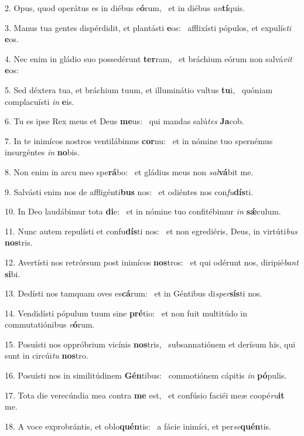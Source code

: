 2. Opus, quod operátus es in diébus e\textbf{ó}rum, \ast\  et in diébus \textit{an}\textbf{tí}quis.\

3. Manus tua gentes dispérdidit, et plantásti \textbf{e}os: \ast\  afflixísti pópulos, et expulís\textit{ti} \textbf{e}os.\

4. Nec enim in gládio suo possedérunt \textbf{ter}ram, \ast\  et bráchium eórum non salvá\textit{vit} \textbf{e}os:\

5. Sed déxtera tua, et bráchium tuum, et illuminátio vultus \textbf{tu}i, \ast\  quóniam complacuísti \textit{in} \textbf{e}is.\

6. Tu es ipse Rex meus et Deus \textbf{me}us: \ast\  qui mandas salú\textit{tes} \textbf{Ja}cob.\

7. In te inimícos nostros ventilábimus \textbf{cor}nu: \ast\  et in nómine tuo spernémus insurgéntes \textit{in} \textbf{no}bis.\

8. Non enim in arcu meo spe\textbf{rá}bo: \ast\  et gládius meus non \textit{sal}\textbf{vá}bit me.\

9. Salvásti enim nos de affligénti\textbf{bus} nos: \ast\  et odiéntes nos con\textit{fu}\textbf{dís}ti.\

10. In Deo laudábimur tota \textbf{di}e: \ast\  et in nómine tuo confitébimur \textit{in} \textbf{sǽ}culum.\

11. Nunc autem repulísti et confu\textbf{dís}ti nos: \ast\  et non egrediéris, Deus, in virtúti\textit{bus} \textbf{nos}tris.\

12. Avertísti nos retrórsum post inimícos \textbf{nos}tros: \ast\  et qui odérunt nos, diripié\textit{bant} \textbf{si}bi.\

13. Dedísti nos tamquam oves es\textbf{cá}rum: \ast\  et in Géntibus di\textit{sper}\textbf{sís}ti nos.\

14. Vendidísti pópulum tuum sine \textbf{pré}tio: \ast\  et non fuit multitúdo in commutatiónibus \textit{e}\textbf{ó}rum.\

15. Posuísti nos oppróbrium vicínis \textbf{nos}tris, \ast\  subsannatiónem et derísum his, qui sunt in circúi\textit{tu} \textbf{nos}tro.\

16. Posuísti nos in similitúdinem \textbf{Gén}tibus: \ast\  commotiónem cápitis \textit{in} \textbf{pó}pulis.\

17. Tota die verecúndia mea contra \textbf{me} est, \ast\  et confúsio faciéi meæ coopé\textit{ru}\textbf{it} me.\

18. A voce exprobrántis, et oblo\textbf{quén}tis: \ast\  a fácie inimíci, et per\textit{se}\textbf{quén}tis.\

